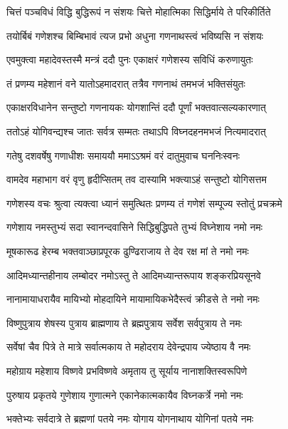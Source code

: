 \twolineshloka
{चित्तं पञ्चविधं विद्धि बुद्धिरूपं न संशयः}
{चित्ते मोहात्मिका सिद्धिर्माये ते परिकीर्तिते} %

\twolineshloka
{तयोर्बिबं गणेशश्च बिम्बिभावं त्यज प्रभो}
{अधुना गणनाथस्त्वं भविष्यसि न संशयः} %

\twolineshloka
{एवमुक्त्वा महादेवस्तस्मै मन्त्रं ददौ पुनः}
{एकाक्षरं गणेशस्य सविधिं करुणायुतः} %

\twolineshloka
{तं प्रणम्य महेशानं वने यातोऽहमादरात्}
{तत्रैव गणनाथं तमभजं भक्तिसंयुतः} %

\twolineshloka
{एकाक्षरविधानेन सन्तुष्टो गणनायकः}
{योगशान्तिं ददौ पूर्णां भक्तवात्सल्यकारणात्} %

\twolineshloka
{ततोऽहं योगिवन्द्यश्च जातः सर्वत्र सम्मतः}
{तथाऽपि विघ्नदहनमभजं नित्यमादरात्} %

\twolineshloka
{गतेषु दशवर्षेषु गणाधीशः समाययौ}
{ममाऽऽश्रमं वरं दातुमुवाच घननिःस्वनः} %


\twolineshloka
{वामदेव महाभाग वरं वृणु हृदीप्सितम्}
{तव दास्यामि भक्त्याऽहं सन्तुष्टो योगिसत्तम} %

\twolineshloka
{गणेशस्य वचः श्रुत्वा त्यक्त्वा ध्यानं समुत्थितः}
{प्रणम्य तं गणेशं सम्पूज्य स्तोतुं प्रचक्रमे} %


\twolineshloka
{गणेशाय नमस्तुभ्यं सदा स्वानन्दवासिने}
{सिद्धिबुद्धिपते तुभ्यं विघ्नेशाय नमो नमः} %

\twolineshloka
{मूषकारूढ हेरम्ब भक्तवाञ्छाप्रपूरक}
{ढुण्ढिराजाय ते देव रक्ष मां ते नमो नमः} %

\twolineshloka
{आदिमध्यान्तहीनाय लम्बोदर नमोऽस्तु ते}
{आदिमध्यान्तरूपाय शङ्करप्रियसूनवे} %

\twolineshloka
{नानामायाधरायैव मायिभ्यो मोहदायिने}
{मायामायिकभेदैस्त्वं क्रीडसे ते नमो नमः} %

\twolineshloka
{विष्णुपुत्राय शेषस्य पुत्राय ब्राह्मणाय ते}
{ब्रह्मपुत्राय सर्वेश सर्वपुत्राय ते नमः} %

\twolineshloka
{सर्वेषां चैव पित्रे ते मात्रे सर्वात्मकाय ते}
{महोदराय देवेन्द्रपाय ज्येष्ठाय वै नमः} %

\twolineshloka
{महोग्राय महेशाय विष्णवे प्रभविष्णवे}
{अमृताय तु सूर्याय नानाशक्तिस्वरूपिणे} %

\twolineshloka
{पुरुषाय प्रकृतये गुणेशाय गुणात्मने}
{एकानेकात्मकायैव विघ्नकर्त्रे नमो नमः} %

\twolineshloka
{भक्तेभ्यः सर्वदात्रे ते ब्रह्मणां पतये नमः}
{योगाय योगनाथाय योगिनां पतये नमः} %

